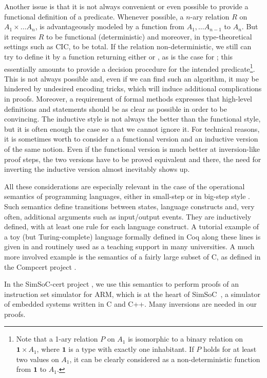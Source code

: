 Another issue is that it is not always convenient or even possible to
provide a functional definition of a predicate.
Whenever possible,
a $n$-ary relation $R$ on $A_1 \times \ldots A_n$, %
is advantageously modeled by a function from $A_1, \ldots A_{n-1}$ to $A_n$.
But it requires $R$ to be functional (deterministic) and moreover,
in type-theoretical settings such as CIC, to be total.
If the relation non-deterministic,
we still can try to 
define it by a function returning either 
or , as is the case for ;
this essentially amounts to provide a decision procedure for 
the intended predicate\footnote{
Note that a 1-ary relation $P$ on $A_1$ is isomorphic to a 
binary relation on $\mathbf{1}\times A_1$,
where $\mathbf{1}$ is a type with exactly one inhabitant.
If $P$ holds for at least two values on $A_1$, 
it can be clearly considered as a non-deterministic 
function from $\mathbf{1}$ to $A_1$.
}.
This is not always possible and, even if we can find such an
algorithm, it may be hindered by undesired encoding tricks,
which will induce additional complications in proofs. 
Moreover, a requirement of formal methods expresses that
high-level definitions and statements should be as clear 
as possible in order to be convincing. 
The inductive style is not always the better than the functional
style, but it is often enough the case so that we cannot
ignore it. 
For technical reasons, it is sometimes worth to consider a 
a functional version and an inductive version of the same notion.
Even if the functional version is much better at inversion-like
proof steps, 
the two versions have to be proved equivalent and there,
the need for inverting the inductive version almost inevitably shows up.


All these considerations are especially relevant in the case
of the operational semantics of programming languages,
either in small-step or in big-step style \cite{nielson}. 
Such semantics define transitions between states,
language constructs and,
very often, additional arguments such as input/output events. 
They are inductively defined, 
with at least one rule for each language construct. 
A tutorial example of a toy (but Turing-complete) language 
formally defined in Coq along these lines
is given in \cite{Pierce:SF}
and routinely used as a teaching support in many universities.
A much more involved example
is the semantics of a fairly large subset of C, as defined in 
the Compcert project \cite{Leroy-Compcert-CACM}.

In the SimSoC-cert project \cite{cpp11}, 
we use this semantics to perform proofs of 
an instruction set simulator for ARM,
which is at the heart of SimSoC~\cite{rapido11}, 
a simulator of embedded systems written in C and C++.
Many inversions are needed in our proofs.


